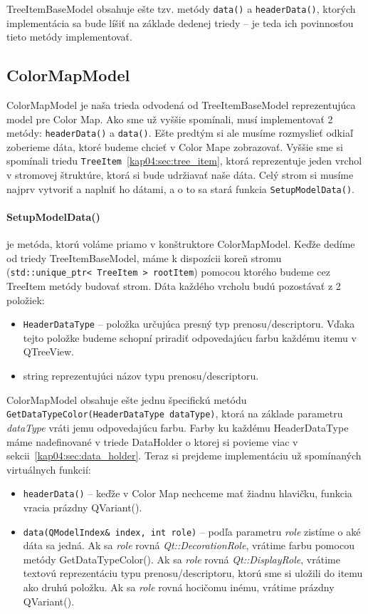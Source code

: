TreeItemBaseModel obsahuje ešte tzv.  metódy \texttt{data()} a \newline\texttt{headerData()}, ktorých implementácia sa bude líšiť na základe dedenej triedy -- je teda ich povinnosťou tieto metódy implementovať.


\subsection{ColorMapModel}
ColorMapModel je naša trieda odvodená od TreeItemBaseModel reprezentujúca model pre Color Map. Ako sme už vyššie spomínali, musí implementovať 2 metódy: \texttt{headerData()} a \texttt{data()}. Ešte predtým si ale musíme rozmyslieť odkiaľ zoberieme dáta, ktoré budeme chcieť v Color Mape zobrazovať. Vyššie sme si spomínali triedu \texttt{TreeItem}~\ref{kap04:sec:tree_item}, ktorá reprezentuje jeden vrchol v stromovej štruktúre, ktorá si bude udržiavať naše dáta. Celý strom si musíme najprv vytvoriť a naplniť ho dátami, a o to sa stará funkcia \texttt{SetupModelData()}.

\paragraph{SetupModelData()} je metóda, ktorú voláme priamo v konštruktore ColorMapModel. Keďže dedíme od triedy TreeItemBaseModel, máme k dispozícii koreň stromu (\texttt{std::unique\_ptr\textless~TreeItem~\textgreater~rootItem}) pomocou ktorého budeme cez TreeItem metódy budovať strom. Dáta každého vrcholu budú pozostávať z 2 položiek:
\begin{itemize}
\item \texttt{HeaderDataType} -- položka určujúca presný typ prenosu/descriptoru. Vďa\-ka tejto položke budeme schopní priradiť odpovedajúcu farbu každému itemu v QTreeView.
\item string reprezentujúci názov typu prenosu/descriptoru.
\end{itemize}

ColorMapModel obsahuje ešte jednu špecifickú metódu \newline\texttt{GetDataTypeColor(HeaderDataType dataType)}, ktorá na základe parametru \textit{dataType} vráti jemu odpovedajúcu farbu. Farby ku každému HeaderDataType máme nadefinované v triede DataHolder o ktorej si povieme viac v sekcii~\ref{kap04:sec:data_holder}. Teraz si prejdeme implementáciu už spomínaných virtuálnych funkcií:
\begin{itemize}
\item \texttt{headerData()} -- keďže v Color Map nechceme mať žiadnu hlavičku, funkcia vracia prázdny QVariant().
\item \texttt{data(QModelIndex\& index, int role)} -- podľa parametru \textit{role} zistíme o aké dáta sa jedná. Ak sa \textit{role} rovná \textit{Qt::DecorationRole}, vrátime farbu pomocou metódy GetDataTypeColor(). Ak sa \textit{role} rovná \textit{Qt::DisplayRole}, vrátime textovú reprezentáciu typu prenosu/descriptoru, ktorú sme si uložili do itemu ako druhú položku. Ak sa \textit{role} rovná hocičomu inému, vrátime prázdny QVariant().
\end{itemize}


